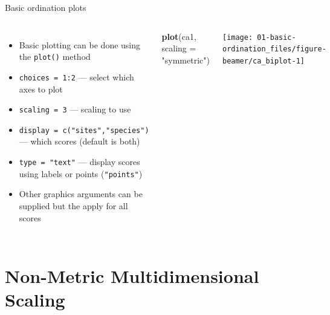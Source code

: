 \documentclass[10pt,ignorenonframetext,compress, aspectratio=169]{beamer}
\newenvironment{Shaded}{\begin{snugshade}}{\end{snugshade}}
\newcommand{\KeywordTok}[1]{\textcolor[rgb]{0.13,0.29,0.53}{\textbf{{#1}}}}
\newcommand{\DataTypeTok}[1]{\textcolor[rgb]{0.13,0.29,0.53}{{#1}}}
\newcommand{\StringTok}[1]{\textcolor[rgb]{0.31,0.60,0.02}{{#1}}}
\newcommand{\NormalTok}[1]{{#1}}
\providecommand{\tightlist}{%
  \setlength{\itemsep}{0pt}\setlength{\parskip}{0pt}}
\newcommand{\columnsbegin}{\begin{columns}}
\newcommand{\columnsend}{\end{columns}}
\begin{document}
\begin{frame}[fragile]{Basic ordination plots}

\columnsbegin
{}

\begin{itemize}
\tightlist
\item
  Basic plotting can be done using the \texttt{plot()} method
\item
  \texttt{choices\ =\ 1:2} --- select which axes to plot
\item
  \texttt{scaling\ =\ 3} --- scaling to use
\item
  \texttt{display\ =\ c("sites","species")} --- which scores (default is
  both)
\item
  \texttt{type\ =\ "text"} --- display scores using labels or points
  (\texttt{"points"})
\item
  Other graphics arguments can be supplied but the apply for all scores
\end{itemize}


\begin{Shaded}
\begin{Highlighting}[]
\KeywordTok{plot}\NormalTok{(ca1, }\DataTypeTok{scaling =} \StringTok{"symmetric"}\NormalTok{)}
\end{Highlighting}
\end{Shaded}

\begin{center}\texttt{[image: 01-basic-ordination\_files/figure-beamer/ca\_biplot-1]} \end{center}

\columnsend

\end{frame}

\section{Non-Metric Multidimensional
Scaling}\label{non-metric-multidimensional-scaling}
\end{document}
